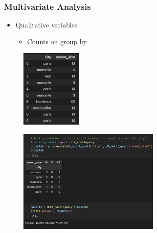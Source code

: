 \begin{frame}\frametitle{Multivariate Analysis}
   \begin{minipage}{0.42\linewidth}
      \begin{itemize}
         \item Qualitative variables
         \begin{itemize}
            \item Counts on group by
         \end{itemize}
      \end{itemize}
      \vspace{.5cm}
      \begin{figure}[H]
         \includegraphics[width=3cm]{../images/illustrations/pattern_multivariate_qualitative_df.png}
      \end{figure}
   \end{minipage}
   \begin{minipage}{0.54\linewidth}
      \begin{figure}[H]
         \includegraphics[width=7cm]{../images/illustrations/pattern_multivariate_qualitative_stat_test.png}
      \end{figure}
   \end{minipage}
\end{frame}





